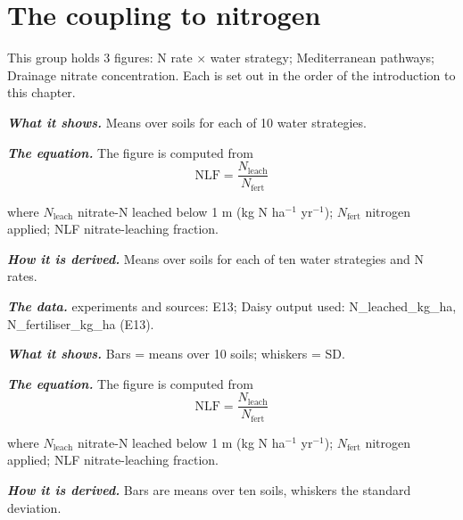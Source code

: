 \section{The coupling to nitrogen}
This group holds 3 figures: N rate $\times$ water strategy; Mediterranean pathways; Drainage nitrate concentration. Each is set out in the order of the introduction to this chapter.
\par\vspace{6pt}\noindent{}\par\nobreak
{}\label{fig:a20_27}
\par\noindent\textbf{\color{khmag}\emph{What it shows.}} Means over soils for each of 10 water strategies.
\par\noindent\textbf{\color{khmag}\emph{The equation.}} The figure is computed from
\begin{equation}\boxed{\mathrm{NLF}=\dfrac{N_{\mathrm{leach}}}{N_{\mathrm{fert}}}}\end{equation}
\par\noindent where $N_{\mathrm{leach}}$ nitrate-N leached below 1 m (kg N ha$^{-1}$ yr$^{-1}$); $N_{\mathrm{fert}}$ nitrogen applied; NLF nitrate-leaching fraction.
\par\noindent\textbf{\color{khmag}\emph{How it is derived.}} Means over soils for each of ten water strategies and N rates.
\par\noindent\textbf{\color{khmag}\emph{The data.}} experiments and sources: E13; Daisy output used: N\_leached\_kg\_ha, N\_fertiliser\_kg\_ha (E13).
\par\vspace{6pt}\noindent{}\par\nobreak
{}\label{fig:a20_28}
\par\noindent\textbf{\color{khmag}\emph{What it shows.}} Bars = means over 10 soils; whiskers = SD.
\par\noindent\textbf{\color{khmag}\emph{The equation.}} The figure is computed from
\begin{equation}\boxed{\mathrm{NLF}=\dfrac{N_{\mathrm{leach}}}{N_{\mathrm{fert}}}}\end{equation}
\par\noindent where $N_{\mathrm{leach}}$ nitrate-N leached below 1 m (kg N ha$^{-1}$ yr$^{-1}$); $N_{\mathrm{fert}}$ nitrogen applied; NLF nitrate-leaching fraction.
\par\noindent\textbf{\color{khmag}\emph{How it is derived.}} Bars are means over ten soils, whiskers the standard deviation.
